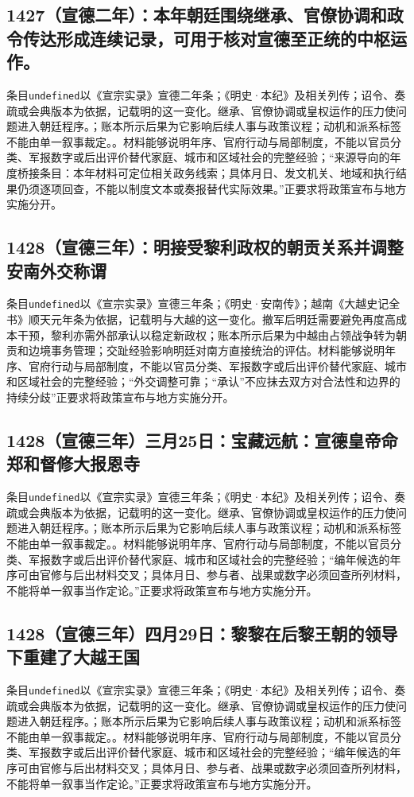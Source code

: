 \subsection{1427（宣德二年）：本年朝廷围绕继承、官僚协调和政令传达形成连续记录，可用于核对宣德至正统的中枢运作。}
条目\texttt{undefined}以《宣宗实录》宣德二年条；《明史·本纪》及相关列传；诏令、奏疏或会典版本为依据，记载明的这一变化。继承、官僚协调或皇权运作的压力使问题进入朝廷程序。；账本所示后果为它影响后续人事与政策议程；动机和派系标签不能由单一叙事裁定。。材料能够说明年序、官府行动与局部制度，不能以官员分类、军报数字或后出评价替代家庭、城市和区域社会的完整经验；“来源导向的年度桥接条目：本年材料可定位相关政务线索；具体月日、发文机关、地域和执行结果仍须逐项回查，不能以制度文本或奏报替代实际效果。”正要求将政策宣布与地方实施分开。

\subsection{1428（宣德三年）：明接受黎利政权的朝贡关系并调整安南外交称谓}
条目\texttt{undefined}以《宣宗实录》宣德三年条；《明史·安南传》；越南《大越史记全书》顺天元年条为依据，记载明与大越的这一变化。撤军后明廷需要避免再度高成本干预，黎利亦需外部承认以稳定新政权；账本所示后果为中越由占领战争转为朝贡和边境事务管理；交趾经验影响明廷对南方直接统治的评估。材料能够说明年序、官府行动与局部制度，不能以官员分类、军报数字或后出评价替代家庭、城市和区域社会的完整经验；“外交调整可靠；“承认”不应抹去双方对合法性和边界的持续分歧”正要求将政策宣布与地方实施分开。

\subsection{1428（宣德三年）三月25日：宝藏远航：宣德皇帝命郑和督修大报恩寺}
条目\texttt{undefined}以《宣宗实录》宣德三年条；《明史·本纪》及相关列传；诏令、奏疏或会典版本为依据，记载明的这一变化。继承、官僚协调或皇权运作的压力使问题进入朝廷程序。；账本所示后果为它影响后续人事与政策议程；动机和派系标签不能由单一叙事裁定。。材料能够说明年序、官府行动与局部制度，不能以官员分类、军报数字或后出评价替代家庭、城市和区域社会的完整经验；“编年候选的年序可由官修与后出材料交叉；具体月日、参与者、战果或数字必须回查所列材料，不能将单一叙事当作定论。”正要求将政策宣布与地方实施分开。

\subsection{1428（宣德三年）四月29日：黎黎在后黎王朝的领导下重建了大越王国}
条目\texttt{undefined}以《宣宗实录》宣德三年条；《明史·本纪》及相关列传；诏令、奏疏或会典版本为依据，记载明的这一变化。继承、官僚协调或皇权运作的压力使问题进入朝廷程序。；账本所示后果为它影响后续人事与政策议程；动机和派系标签不能由单一叙事裁定。。材料能够说明年序、官府行动与局部制度，不能以官员分类、军报数字或后出评价替代家庭、城市和区域社会的完整经验；“编年候选的年序可由官修与后出材料交叉；具体月日、参与者、战果或数字必须回查所列材料，不能将单一叙事当作定论。”正要求将政策宣布与地方实施分开。

